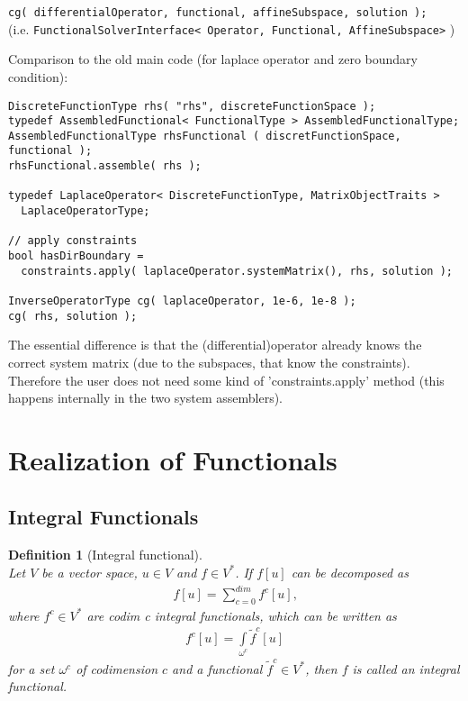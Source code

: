 \documentclass[a4paper,11pt]{article}
\numberwithin{equation}{section}
\newtheorem{definition}{Definition}[section]
\newcommand{\theoremNewline}{\hspace{1mm}\\}
\newcommand{\theoremEndLine}{\hspace{1mm}}
\newcommand{\CodeT}[1]{\textnormal{\texttt{#1}}}
\newcommand{\komma}{\text{,}}
\begin{document}
\CodeT{\footnotesize cg( differentialOperator, functional, affineSubspace, solution );}\\
(i.e. \CodeT{FunctionalSolverInterface< Operator, Functional, AffineSubspace>} )

Comparison to the old main code (for laplace operator and zero boundary condition):
\begin{lstlisting}
DiscreteFunctionType rhs( "rhs", discreteFunctionSpace );
typedef AssembledFunctional< FunctionalType > AssembledFunctionalType; 
AssembledFunctionalType rhsFunctional ( discretFunctionSpace, functional );
rhsFunctional.assemble( rhs );

typedef LaplaceOperator< DiscreteFunctionType, MatrixObjectTraits > 
  LaplaceOperatorType;

// apply constraints
bool hasDirBoundary = 
  constraints.apply( laplaceOperator.systemMatrix(), rhs, solution );

InverseOperatorType cg( laplaceOperator, 1e-6, 1e-8 );
cg( rhs, solution );
\end{lstlisting}

The essential difference is that the (differential)operator already knows the correct system matrix (due to the subspaces, that know the constraints). Therefore the user does not need some kind of 'constraints.apply' method (this happens internally in the two system assemblers).

\section{Realization of Functionals}

  \subsection{Integral Functionals}

    \begin{definition}[Integral functional]\theoremNewline
      Let $V$ be a vector space, ${u \in V}$ and ${f \in V^*}$. If $f[u]$ can
      be decomposed as
      \begin{align}
        f[u] = \sum\limits_{c = 0}^{dim}
            {
              f^c [u]
            }\komma
      \end{align}
      where ${f^c \in V^*}$ are \textnormal{codim c integral functionals}, which can be written as
      \begin{align}
        f^c [u] = \int\limits_{\omega^c} \tilde{f}^c[u]
      \end{align}
      for a set $\omega^c$ of codimension $c$ and a functional ${\tilde{f}^c \in V^*}$, then $f$ is called an
      \textnormal{integral functional}.
    \end{definition}\theoremEndLine
\end{document}
